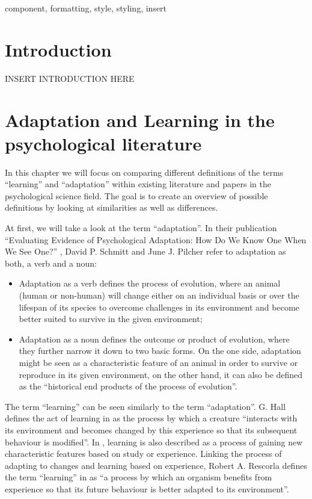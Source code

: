 \documentclass[conference]{IEEEtran}
\begin{document}
\begin{IEEEkeywords}
	component, formatting, style, styling, insert
\end{IEEEkeywords}

\section{Introduction}
	INSERT INTRODUCTION HERE

\section{Adaptation and Learning in the psychological literature}

	In this chapter we will focus on comparing different definitions of the terms “learning” and “adaptation” within existing literature and papers in the psychological science field. The goal is to create an overview of possible definitions by looking at similarities as well as differences.

	At first, we will take a look at the term “adaptation”. In their publication “Evaluating Evidence of Psychological Adaptation: How Do We Know One When We See One?” \cite{b1}, David P. Schmitt and June J. Pilcher refer to adaptation as both, a verb and a noun:
	\begin{itemize}
		\item Adaptation as a verb defines the process of evolution, where an animal (human or non-human) will change either on an individual basis or over the lifespan of its species to overcome challenges in its environment and become better suited to survive in the given environment;
		\item Adaptation as a noun defines the outcome or product of evolution, where they further narrow it down to two basic forms. On the one side, adaptation might be seen as a characteristic feature of an animal in order to survive or reproduce in its given environment, on the other hand, it can also be defined as the “historical end products of the process of evolution”.
	\end{itemize}

	The term “learning” can be seen similarly to the term “adaptation”. G. Hall defines the act of learning in \cite{b2} as the process by which a creature “interacts with its environment and becomes changed by this experience so that its subsequent behaviour is modified”. In \cite{b3}, learning is also described as a process of gaining new characteristic features based on study or experience. Linking the process of adapting to changes and learning based on experience, Robert A. Rescorla defines the term “learning” in \cite{b4} as “a process by which an organism benefits from experience so that its future behaviour is better adapted to its environment”.
\end{document}
